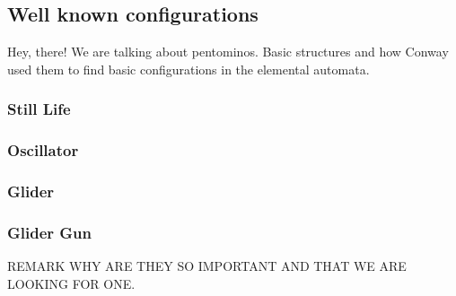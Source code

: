 
\subsection{Well known configurations}
Hey, there! We are talking about pentominos. Basic structures and how
Conway used them to find basic configurations in the elemental automata.

\subsubsection{Still Life}
\subsubsection{Oscillator}
\subsubsection{Glider}
\subsubsection{Glider Gun}
REMARK WHY ARE THEY SO IMPORTANT AND THAT WE ARE LOOKING FOR ONE.
